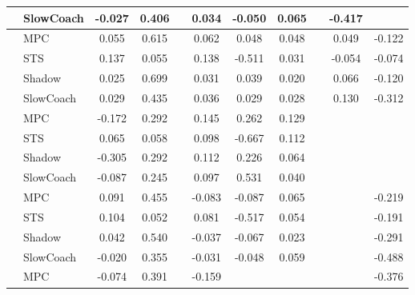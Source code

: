 \begin{tabular}{|l|l|*{9}{c|}}
                                                           & SlowCoach &   -0.027 &     0.406 &        &  0.034 & -0.050 &  0.065 &      &  -0.417 &       \\
\midrule
[True, True, False, True, True, True, False, True, True] & MPC &    0.055 &     0.615 &        &  0.062 &  0.048 &  0.048 &      &   0.049 &   -0.122 \\
                                                           & STS &    0.137 &     0.055 &        &  0.138 & -0.511 &  0.031 &      &  -0.054 &   -0.074 \\
                                                           & Shadow &    0.025 &     0.699 &        &  0.031 &  0.039 &  0.020 &      &   0.066 &   -0.120 \\
                                                           & SlowCoach &    0.029 &     0.435 &        &  0.036 &  0.029 &  0.028 &      &   0.130 &   -0.312 \\
\midrule
[True, True, False, True, True, True, False, False, False] & MPC &   -0.172 &     0.292 &        &  0.145 &  0.262 &  0.129 &      &      &       \\
                                                           & STS &    0.065 &     0.058 &        &  0.098 & -0.667 &  0.112 &      &      &       \\
                                                           & Shadow &   -0.305 &     0.292 &        &  0.112 &  0.226 &  0.064 &      &      &       \\
                                                           & SlowCoach &   -0.087 &     0.245 &        &  0.097 &  0.531 &  0.040 &      &      &       \\
\midrule
[True, True, False, True, True, True, False, False, True] & MPC &    0.091 &     0.455 &        & -0.083 & -0.087 &  0.065 &      &      &   -0.219 \\
                                                           & STS &    0.104 &     0.052 &        &  0.081 & -0.517 &  0.054 &      &      &   -0.191 \\
                                                           & Shadow &    0.042 &     0.540 &        & -0.037 & -0.067 &  0.023 &      &      &   -0.291 \\
                                                           & SlowCoach &   -0.020 &     0.355 &        & -0.031 & -0.048 &  0.059 &      &      &   -0.488 \\
\midrule
[True, True, False, True, False, False, False, False, True] & MPC &   -0.074 &     0.391 &        & -0.159 &     &     &      &      &   -0.376 \\

\end{tabular}
